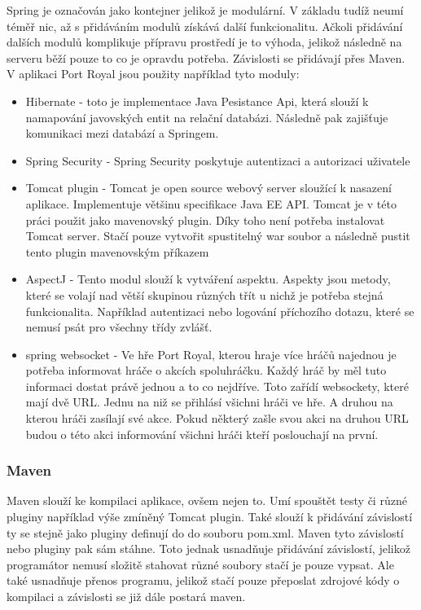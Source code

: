 \documentclass[czech,master,public,dept460,male,cpdeclaration,twoside]{diploma}
\begin{document}
Spring je označován jako kontejner jelikož je modulární. V základu tudíž neumí téměř nic, až s přidáváním modulů získává další funkcionalitu. Ačkoli  přidávání dalších modulů komplikuje přípravu prostředí je to výhoda, jelikož následně na serveru běží pouze to co je opravdu potřeba. Závislosti se přidávají přes Maven. V aplikaci Port Royal jsou použity například tyto moduly:
\begin{itemize}
	\item Hibernate - toto je implementace Java Pesistance Api, která slouží k namapování javovských entit na relační databázi. Následně pak zajišťuje komunikaci mezi databází a Springem.
	\item Spring Security - Spring Security poskytuje autentizaci a autorizaci uživatele
	\item Tomcat plugin - Tomcat je open source webový server sloužící k nasazení aplikace. Implementuje většinu specifikace Java EE API. Tomcat je v této práci použit jako mavenovský plugin. Díky toho není potřeba instalovat Tomcat server. Stačí pouze vytvořit spustitelný war soubor a následně pustit tento plugin mavenovským příkazem	
	\item AspectJ - Tento modul slouží k vytváření aspektu. Aspekty jsou metody, které se volají nad větší skupinou různých třít u nichž je potřeba stejná funkcionalita. Například autentizaci nebo logování příchozího dotazu, které se nemusí psát pro všechny třídy zvlášť.
	\item spring websocket - Ve hře Port Royal, kterou hraje více hráčů najednou je potřeba informovat hráče o akcích spoluhráčku. Každý hráč by měl tuto informaci dostat právě jednou a to co nejdříve. Toto zařídí websockety, které mají dvě URL. Jednu na niž se přihlásí všichni hráči ve hře. A druhou na kterou hráči zasílají své akce. Pokud některý zašle svou akci na druhou URL budou o této akci informování všichni hráči kteří poslouchají na první.
\end{itemize}

\subsubsection{Maven}
Maven slouží ke kompilaci aplikace, ovšem nejen to. Umí spouštět testy či různé pluginy například výše zmíněný Tomcat plugin. Také slouží k přidávání závislostí ty se stejně jako pluginy definují do do souboru pom.xml. Maven tyto závislostí nebo pluginy pak sám stáhne. Toto jednak usnadňuje přidávání závislostí, jelikož programátor nemusí složitě stahovat různé soubory stačí je pouze vypsat. Ale také usnadňuje přenos programu, jelikož stačí pouze přeposlat zdrojové kódy o kompilaci a závislosti se již dále postará maven.
\end{document}

